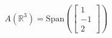 \documentclass[preview]{standalone}
\begin{document}
\begin{align*}
A(\mathbb{R}^3) = \text{Span}\left(\begin{bmatrix} 1 \\ -1 \\ 2 \end{bmatrix}\right)
\end{align*}
\end{document}
